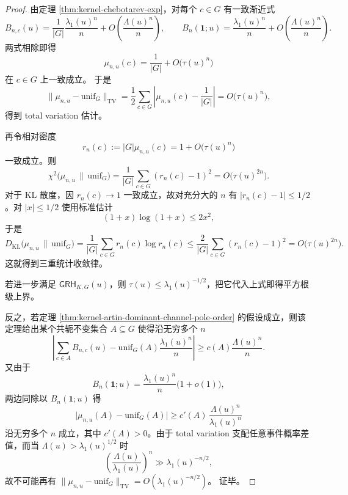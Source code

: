 \begin{proof}
由定理 \ref{thm:kernel-chebotarev-exp}，对每个 \(c\in G\) 有一致渐近式
\[
B_{n,c}(u)
=
\frac{1}{|G|}\frac{\lambda_1(u)^n}{n}
+O\!\left(\frac{\Lambda(u)^n}{n}\right),
\qquad
B_n(\mathbf{1};u)
=
\frac{\lambda_1(u)^n}{n}
+O\!\left(\frac{\Lambda(u)^n}{n}\right).
\]
两式相除即得
\[
\mu_{n,u}(c)=\frac{1}{|G|}+O\!\bigl(\tau(u)^n\bigr)
\]
在 \(c\in G\) 上一致成立。
于是
\[
\|\mu_{n,u}-\mathrm{unif}_G\|_{\mathrm{TV}}
=
\frac12\sum_{c\in G}\left|\mu_{n,u}(c)-\frac{1}{|G|}\right|
=
O\!\bigl(\tau(u)^n\bigr),
\]
得到 total variation 估计。
\par
再令相对密度
\[
r_n(c):=|G|\mu_{n,u}(c)=1+O\!\bigl(\tau(u)^n\bigr)
\]
一致成立。则
\[
\chi^2\!\bigl(\mu_{n,u}\,\|\,\mathrm{unif}_G\bigr)
=
\frac{1}{|G|}\sum_{c\in G}(r_n(c)-1)^2
=
O\!\bigl(\tau(u)^{2n}\bigr).
\]
对于 KL 散度，因 \(r_n(c)\to 1\) 一致成立，故对充分大的 \(n\) 有 \(|r_n(c)-1|\le 1/2\)。对 \(|x|\le 1/2\) 使用标准估计
\[
(1+x)\log(1+x)\le 2x^2,
\]
于是
\[
D_{\mathrm{KL}}\!\bigl(\mu_{n,u}\,\|\,\mathrm{unif}_G\bigr)
=
\frac{1}{|G|}\sum_{c\in G}r_n(c)\log r_n(c)
\le
\frac{2}{|G|}\sum_{c\in G}(r_n(c)-1)^2
=
O\!\bigl(\tau(u)^{2n}\bigr).
\]
这就得到三重统计收敛律。
\par
若进一步满足 \(\textsf{GRH}_{K,G}(u)\)，则 \(\tau(u)\le \lambda_1(u)^{-1/2}\)，把它代入上式即得平方根级上界。
\par
反之，若定理 \ref{thm:kernel-artin-dominant-channel-pole-order} 的假设成立，则该定理给出某个共轭不变集合 \(A\subseteq G\) 使得沿无穷多个 \(n\)
\[
\left|\sum_{c\in A}B_{n,c}(u)-\mathrm{unif}_G(A)\frac{\lambda_1(u)^n}{n}\right|
\ge
c(A)\frac{\Lambda(u)^n}{n}.
\]
又由于
\[
B_n(\mathbf{1};u)=\frac{\lambda_1(u)^n}{n}\bigl(1+o(1)\bigr),
\]
两边同除以 \(B_n(\mathbf{1};u)\) 得
\[
\bigl|\mu_{n,u}(A)-\mathrm{unif}_G(A)\bigr|
\ge
c'(A)\,\frac{\Lambda(u)^n}{\lambda_1(u)^n}
\]
沿无穷多个 \(n\) 成立，其中 \(c'(A)>0\)。由于 total variation 支配任意事件概率差值，而当 \(\Lambda(u)>\lambda_1(u)^{1/2}\) 时
\[
\left(\frac{\Lambda(u)}{\lambda_1(u)}\right)^n
\gg
\lambda_1(u)^{-n/2},
\]
故不可能再有
\(
\|\mu_{n,u}-\mathrm{unif}_G\|_{\mathrm{TV}}
=
O(\lambda_1(u)^{-n/2})
\)。
证毕。
\end{proof}

\endinput
